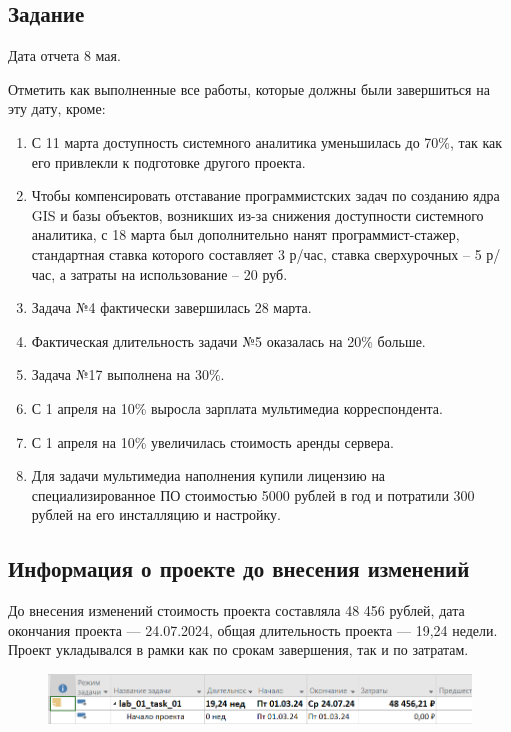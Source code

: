 \subsection*{Задание}

Дата отчета 8 мая.


Отметить как выполненные все работы, которые должны были завершиться на эту дату, кроме:

\begin{enumerate}
    \item С 11 марта доступность системного аналитика уменьшилась до 70\%, так как его привлекли к подготовке другого проекта.
    \item Чтобы компенсировать отставание программистских задач по созданию ядра GIS и базы объектов, возникших из-за снижения доступности системного аналитика, с 18 марта был дополнительно нанят программист-стажер, стандартная ставка которого составляет 3 р/час, ставка сверхурочных – 5 р/час, а затраты на использование – 20 руб.
    \item Задача №4 фактически завершилась 28 марта.
    \item Фактическая длительность задачи №5 оказалась на 20\% больше.
    \item Задача №17 выполнена на 30\%.
    \item С 1 апреля на 10\% выросла зарплата мультимедиа корреспондента.
    \item С 1 апреля на 10\% увеличилась стоимость аренды сервера.
    \item Для задачи мультимедиа наполнения купили лицензию на специализированное ПО стоимостью 5000 рублей в год и потратили 300 рублей на его инсталляцию и настройку.
\end{enumerate}

\subsection*{Информация о проекте до внесения изменений}

До внесения изменений стоимость проекта составляла 48 456 рублей, дата окончания проекта --- 24.07.2024, общая длительность проекта --- 19,24 недели. Проект укладывался в рамки как по срокам завершения, так и по затратам.

\begin{figure}[h!]
	\begin{center}
		\includegraphics[scale=0.6]{inc/img/p_1.png}
	\end{center}
	\captionsetup{justification=centering}
	\label{fig:u3}
\end{figure}

